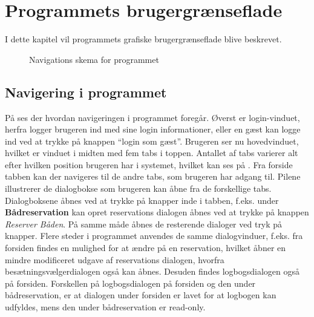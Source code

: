 \chapter{Programmets brugergrænseflade}


I dette kapitel vil programmets grafiske brugergrænseflade blive beskrevet.

\begin{center}
    \begin{figure}[H]
        \caption{Navigations skema for programmet}
        \label{img:programNavigation}
        \vspace{-60pt}
    \end{figure}
\end{center}


\section{Navigering i programmet}
På  ses der hvordan navigeringen i programmet foregår.
Øverst er login-vinduet, herfra logger brugeren ind med sine login informationer, eller en gæst kan logge ind ved at trykke på knappen ``login som gæst''. 
Brugeren ser nu hovedvinduet, hvilket er vinduet i midten med fem tabs i toppen.
Antallet af tabs varierer alt efter hvilken position brugeren har i systemet, hvilket kan ses på . 
Fra forside tabben kan der navigeres til de andre tabs, som brugeren har adgang til.
Pilene illustrerer de dialogbokse som brugeren kan åbne fra de forskellige tabs.
Dialogboksene åbnes ved at trykke på knapper inde i tabben, f.eks. under  \textbf{Bådreservation} kan opret reservations dialogen åbnes ved at trykke på knappen \textit{Reserver Båden}. 
På samme måde åbnes de resterende dialoger ved tryk på knapper.
Flere steder i programmet anvendes de samme dialogvinduer, f.eks. fra forsiden findes en mulighed for at ændre på en reservation, hvilket åbner en mindre modificeret udgave af reservations dialogen, hvorfra besætningsvælgerdialogen også kan åbnes.
Desuden findes logbogsdialogen også på forsiden.
Forskellen på logbogsdialogen på forsiden og den under bådreservation, er at dialogen under forsiden er lavet for at logbogen kan udfyldes, mens den under bådreservation er read-only. 




